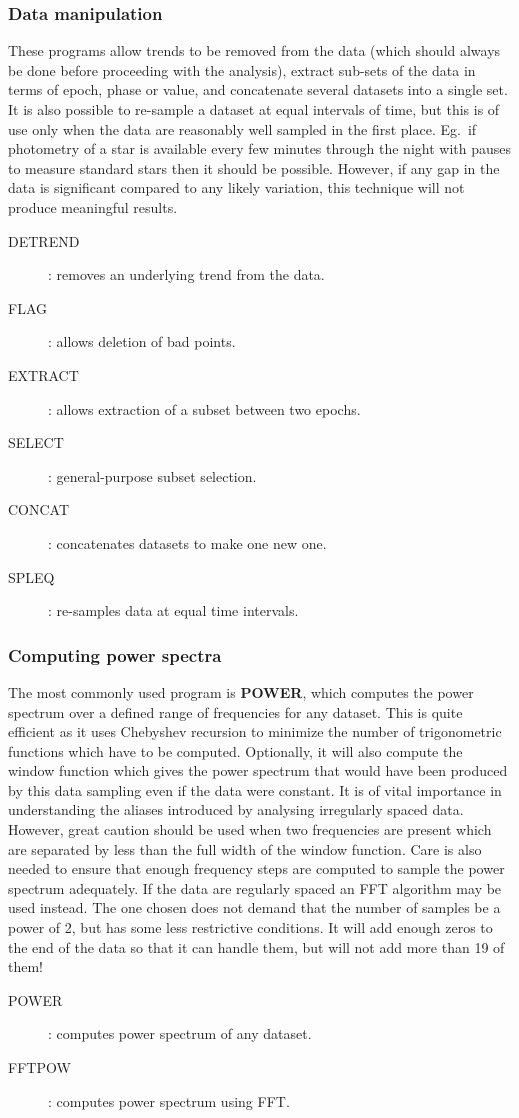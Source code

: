 \subsubsection {Data manipulation}
These programs allow trends to be removed from the data (which should always be
done before proceeding with the analysis), extract sub-sets of the data in
terms of epoch, phase or value, and concatenate several datasets into a single
set.
It is also possible to re-sample a dataset at equal intervals of time, but this
is of use only when the data are reasonably well sampled in the first place.
Eg.\ if photometry of a star is available every few minutes through the night
with pauses to measure standard stars then it should be possible.
However, if any gap in the data is significant compared to any likely variation,
this technique will not produce meaningful results.
\begin{description}
\begin{description}
\item [DETREND]: removes an underlying trend from the data.
\item [FLAG]: allows deletion of bad points.
\item [EXTRACT]: allows extraction of a subset between two epochs.
\item [SELECT]: general-purpose subset selection.
\item [CONCAT]: concatenates datasets to make one new one.
\item [SPLEQ]: re-samples data at equal time intervals.
\end{description}
\end{description}
\subsubsection {Computing power spectra}
The most commonly used program is {\bf POWER}, which computes the power spectrum
over a defined range of frequencies for any dataset.
This is quite efficient as it uses Chebyshev recursion to minimize the number of
trigonometric functions which have to be computed.
Optionally, it will also compute the window function which gives the power
spectrum that would have been produced by this data sampling even if the data
were constant.
It is of vital importance in understanding the aliases introduced by analysing
irregularly spaced data.
However, great caution should be used when two frequencies are present which are
separated by less than the full width of the window function.
Care is also needed to ensure that enough frequency steps are computed to sample
the power spectrum adequately.
If the data are regularly spaced an FFT algorithm may be used instead.
The one chosen does not demand that the number of samples be a power of 2, but
has some less restrictive conditions.
It will add enough zeros to the end of the data so that it can handle them, but
will not add more than 19 of them!
\begin{description}
\begin{description}
\item [POWER]: computes power spectrum of any dataset.
\item [FFTPOW]: computes power spectrum using FFT.
\end{description}
\end{description}
